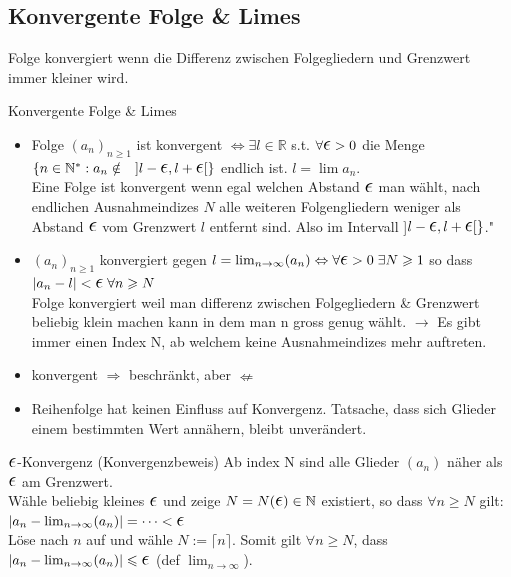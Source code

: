 \documentclass[a4paper]{article}
\let\oldepsilon\epsilon
\renewcommand{\epsilon}{\text{\Large $\oldepsilon$}}
\def\limn{\lim_{n\to \infty}}
\newcommand\R{\ensuremath{\mathbb{R}}}
\begin{document}
\subsection{Konvergente Folge \& Limes}
Folge konvergiert wenn die Differenz zwischen Folgegliedern und Grenzwert immer kleiner wird.
\begin{mainbox}{Konvergente Folge \& Limes}
  \begin{itemize}[leftmargin=3mm, topsep=1pt, parsep=1pt]
    \item Folge $(a_n)_{n \geqslant 1}$ ist konvergent $\Leftrightarrow \exists l \in \R$ s.t. $\forall \epsilon > 0$ die Menge $\{n \in \mathbb{N}^*: a_n \notin \quad ]l - \epsilon, l + \epsilon[\}$ endlich ist. 
        $l = \lim a_n$. \\
      \tiny \color{gray}
        Eine Folge ist konvergent wenn egal welchen Abstand $\epsilon$ man wählt, nach endlichen Ausnahmeindizes $N$ alle weiteren Folgengliedern weniger als Abstand $\epsilon$ vom Grenzwert $l$ entfernt sind. 
        Also im Intervall ]$l - \epsilon, l + \epsilon[\}$." \\
      \normalsize \color{black}
    \item $(a_n)_{n \geqslant 1}$ konvergiert gegen $l = \limn (a_n) \\ \Leftrightarrow \forall \epsilon > 0 \; \exists N \geqslant 1$ so dass $|a_n - l| < \epsilon \; \forall n \geqslant N$ \\
      \tiny \color{gray}
        Folge konvergiert weil man differenz zwischen Folgegliedern \& Grenzwert beliebig klein machen kann in dem man n gross genug wählt. 
        $\rightarrow$ Es gibt immer einen Index N, ab welchem keine Ausnahmeindizes mehr auftreten. 
    \end{itemize}
\end{mainbox}
\begin{itemize}[leftmargin=4.5mm , topsep=0pt, parsep=0pt]
  \item konvergent $\Rightarrow$ beschränkt, aber $\nLeftarrow$ \\
  \item Reihenfolge hat keinen Einfluss auf Konvergenz. Tatsache, dass sich Glieder einem bestimmten Wert annähern, bleibt unverändert.
\end{itemize}

\begin{bspbox}{$\epsilon$-Konvergenz (Konvergenzbeweis)}
  \tiny \color{gray}
    Ab index N sind alle Glieder $(a_n)$ näher als $\epsilon$ am Grenzwert.
  \normalsize \color{black} \\
  Wähle beliebig kleines $\epsilon$ und zeige $N = N(\epsilon) \in \mathbb{N}$ existiert, so dass $\forall n \geqslant N$ gilt: \\ $|a_n - \limn (a_n)| = \dots < \epsilon$ \\ Löse nach $n$ auf und wähle $N := \lceil n \rceil$. Somit gilt $\forall n \geqslant N$, dass $|a_n - \limn (a_n)| \leqslant \epsilon$ (def $\limn$).
\end{bspbox}
\end{document}
